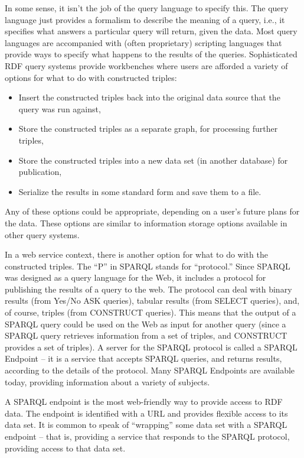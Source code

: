 In some sense, it isn't the job of the query language to specify this.
The query language just provides a formalism to describe the meaning of
a query, i.e., it specifies what answers a particular query will return,
given the data. Most query languages are accompanied with (often
proprietary) scripting languages that provide ways to specify what
happens to the results of the queries. Sophisticated RDF query systems
provide workbenches where users are afforded a variety of options for
what to do with constructed triples:

\begin {itemize}
\item Insert the constructed triples back into the original data source that
the query was run against,

\item Store the constructed triples as a separate graph, for processing
further triples,

\item Store the constructed triples into a new data set (in another database)
for publication,

\item Serialize the results in some standard form and save them to a file.
\end{itemize}

Any of these options could be appropriate, depending on a user's future
plans for the data. These options are similar to information storage
options available in other query systems.

In a web service context, there is another option for what to do with
the constructed triples. The ``P'' in SPARQL stands for ``protocol.''
Since SPARQL was designed as a query language for the Web, it includes a
protocol for publishing the results of a query to the web. The protocol
can deal with binary results (from Yes/No ASK queries), tabular results
(from SELECT queries), and, of course, triples (from CONSTRUCT queries).
This means that the output of a SPARQL query could be used on the Web as
input for another query (since a SPARQL query retrieves information from
a set of triples, and CONSTRUCT provides a set of triples). A server for
the SPARQL protocol is called a SPARQL Endpoint -- it is a service that
accepts SPARQL queries, and returns results, according to the details of
the protocol. Many SPARQL Endpoints are available today, providing
information about a variety of subjects. 


A SPARQL endpoint is the most web-friendly way to provide access to RDF
data. The endpoint is identified with a URL and provides flexible access
to its data set. It is common to speak of ``wrapping''
some data set with a SPARQL endpoint -- that is, providing a service
that responds to the SPARQL 
protocol, providing access to that data set.

